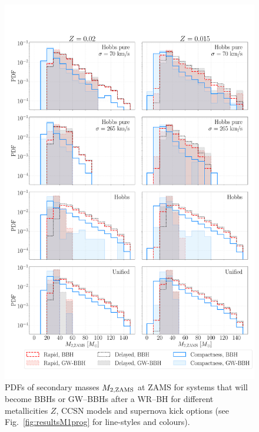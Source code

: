 \documentclass[a4paper,titlepage]{book}     	%
\begin{document}
\begin{figure}
	\centering
	\includegraphics[width=\textwidth]{./images/progM2.pdf}	
	\caption{PDFs of secondary masses $M_{\rm 2,ZAMS}$ at ZAMS for systems that will become BBHs or GW--BBHs after a WR--BH for different metallicities $Z$, CCSN models and supernova kick options (see Fig.\ \ref{fig:resultsM1prog} for line-styles and colours).}\label{fig:resultsM2prog}
\end{figure}
\end{document}
